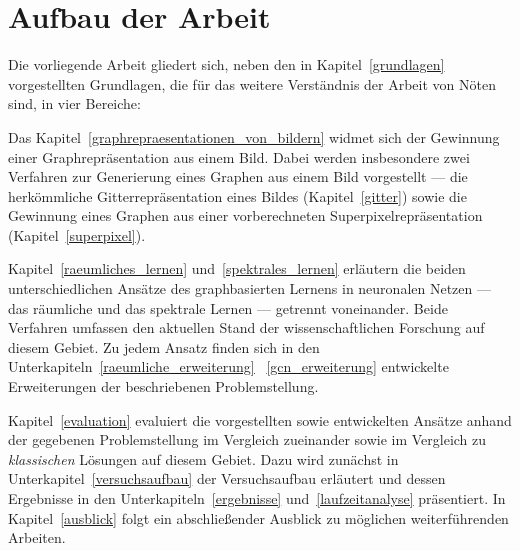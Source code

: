 \section{Aufbau der Arbeit}
\label{aufbau_der_arbeit}

Die vorliegende Arbeit gliedert sich, neben den in Kapitel~\ref{grundlagen} vorgestellten Grundlagen, die für das weitere Verständnis der Arbeit von Nöten sind, in vier Bereiche:

Das Kapitel~\ref{graphrepraesentationen_von_bildern} widmet sich der Gewinnung einer Graphrepräsentation aus einem Bild.
Dabei werden insbesondere zwei Verfahren zur Generierung eines Graphen aus einem Bild vorgestellt — die herkömmliche Gitterrepräsentation eines Bildes (Kapitel~\ref{gitter}) sowie die Gewinnung eines Graphen aus einer vorberechneten Superpixelrepräsentation (Kapitel~\ref{superpixel}).

Kapitel~\ref{raeumliches_lernen} und~\ref{spektrales_lernen} erläutern die beiden unterschiedlichen Ansätze des graphbasierten Lernens in neuronalen Netzen — das räumliche und das spektrale Lernen — getrennt voneinander.
Beide Verfahren umfassen den aktuellen Stand der wissenschaftlichen Forschung auf diesem Gebiet.
Zu jedem Ansatz finden sich in den Unterkapiteln~\ref{raeumliche_erweiterung} \bzw{}~\ref{gcn_erweiterung} entwickelte Erweiterungen \bzgl{} der beschriebenen Problemstellung.

Kapitel~\ref{evaluation} evaluiert die vorgestellten sowie entwickelten Ansätze anhand der gegebenen Problemstellung im Vergleich zueinander sowie im Vergleich zu \emph{klassischen} Lösungen auf diesem Gebiet.
Dazu wird zunächst in Unterkapitel~\ref{versuchsaufbau} der Versuchsaufbau erläutert und dessen Ergebnisse in den Unterkapiteln~\ref{ergebnisse} und~\ref{laufzeitanalyse} präsentiert.
In Kapitel~\ref{ausblick} folgt ein abschließender Ausblick zu möglichen weiterführenden Arbeiten.
